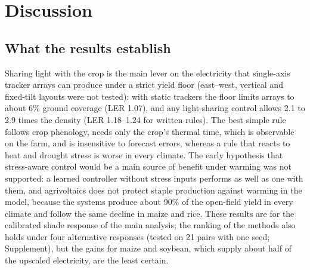 \section{Discussion}\label{sec:discussion}

\subsection{What the results establish}
Sharing light with the crop is the main lever on the electricity that single-axis tracker arrays can produce under a strict yield floor (east--west, vertical and fixed-tilt layouts were not tested): with static trackers the floor limits arrays to about 6\% ground coverage (LER 1.07), and any light-sharing control allows 2.1 to 2.9 times the density (LER 1.18--1.24 for written rules). The best simple rule follows crop phenology, needs only the crop's thermal time, which is observable on the farm, and is insensitive to forecast errors, whereas a rule that reacts to heat and drought stress is worse in every climate. The early hypothesis that stress-aware control would be a main source of benefit under warming was not supported: a learned controller without stress inputs performs as well as one with them, and agrivoltaics does not protect staple production against warming in the model, because the systems produce about 90\% of the open-field yield in every climate and follow the same decline in maize and rice. These results are for the calibrated shade response of the main analysis; the ranking of the methods also holds under four alternative responses (tested on 21 pairs with one seed; Supplement), but the gains for maize and soybean, which supply about half of the upscaled electricity, are the least certain.

